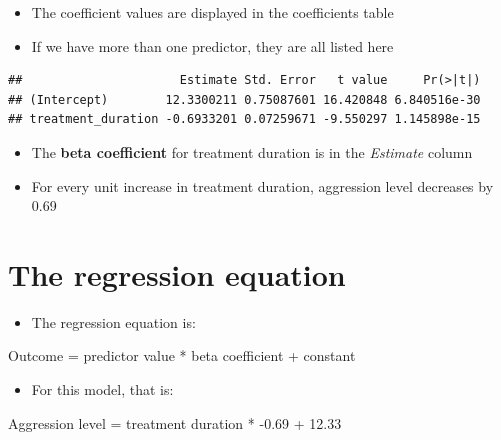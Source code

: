 \documentclass[
]{book}
\newenvironment{Shaded}{\begin{snugshade}}{\end{snugshade}}
\newcommand{\NormalTok}[1]{#1}
\newcommand{\OperatorTok}[1]{\textcolor[rgb]{0.81,0.36,0.00}{\textbf{#1}}}
\providecommand{\tightlist}{%
  \setlength{\itemsep}{0pt}\setlength{\parskip}{0pt}}
\begin{document}
\begin{itemize}
\tightlist
\item
  The coefficient values are displayed in the coefficients table
\item
  If we have more than one predictor, they are all listed here
\end{itemize}

\begin{Shaded}
\end{Shaded}

\begin{verbatim}
##                      Estimate Std. Error   t value     Pr(>|t|)
## (Intercept)        12.3300211 0.75087601 16.420848 6.840516e-30
## treatment_duration -0.6933201 0.07259671 -9.550297 1.145898e-15
\end{verbatim}

\begin{itemize}
\tightlist
\item
  The \textbf{beta coefficient} for treatment duration is in the \emph{Estimate} column
\item
  For every unit increase in treatment duration, aggression level decreases by 0.69
\end{itemize}

\hypertarget{the-regression-equation-1}{%
\section{The regression equation}\label{the-regression-equation-1}}

\begin{itemize}
\tightlist
\item
  The regression equation is:
\end{itemize}

Outcome = predictor value * beta coefficient + constant

\begin{itemize}
\tightlist
\item
  For this model, that is:
\end{itemize}

Aggression level = treatment duration * -0.69 + 12.33

\begin{Shaded}
\end{Shaded}
\end{document}
